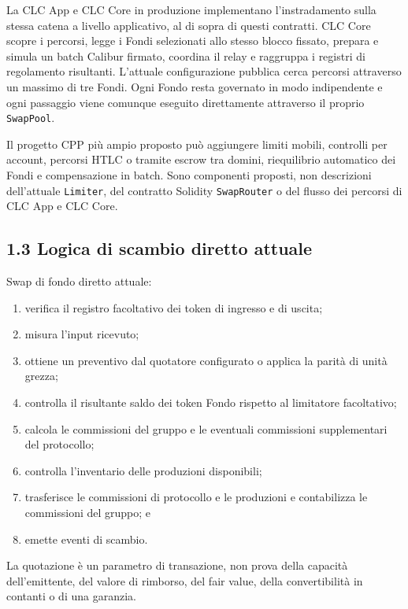 \documentclass[11pt]{article}
\begin{document}
La CLC App e CLC Core in produzione implementano l'instradamento sulla stessa catena a livello applicativo, al di sopra di questi contratti. CLC Core scopre i percorsi, legge i Fondi selezionati allo stesso blocco fissato, prepara e simula un batch Calibur firmato, coordina il relay e raggruppa i registri di regolamento risultanti. L'attuale configurazione pubblica cerca percorsi attraverso un massimo di tre Fondi. Ogni Fondo resta governato in modo indipendente e ogni passaggio viene comunque eseguito direttamente attraverso il proprio \texttt{SwapPool}.

Il progetto CPP più ampio proposto può aggiungere limiti mobili, controlli per account, percorsi HTLC o tramite escrow tra domini, riequilibrio automatico dei Fondi e compensazione in batch. Sono componenti proposti, non descrizioni dell'attuale \texttt{Limiter}, del contratto Solidity \texttt{SwapRouter} o del flusso dei percorsi di CLC App e CLC Core.

\subsection*{1.3 Logica di scambio diretto attuale}

Swap di fondo diretto attuale:

\begin{enumerate}[leftmargin=*]
\item verifica il registro facoltativo dei token di ingresso e di uscita;
\item misura l'input ricevuto;
\item ottiene un preventivo dal quotatore configurato o applica la parità di unità grezza;
\item controlla il risultante saldo dei token Fondo rispetto al limitatore facoltativo;
\item calcola le commissioni del gruppo e le eventuali commissioni supplementari del protocollo;
\item controlla l'inventario delle produzioni disponibili;
\item trasferisce le commissioni di protocollo e le produzioni e contabilizza le commissioni del gruppo; e
\item emette eventi di scambio.
\end{enumerate}
La quotazione è un parametro di transazione, non prova della capacità dell'emittente, del valore di rimborso, del fair value, della convertibilità in contanti o di una garanzia.
\end{document}
